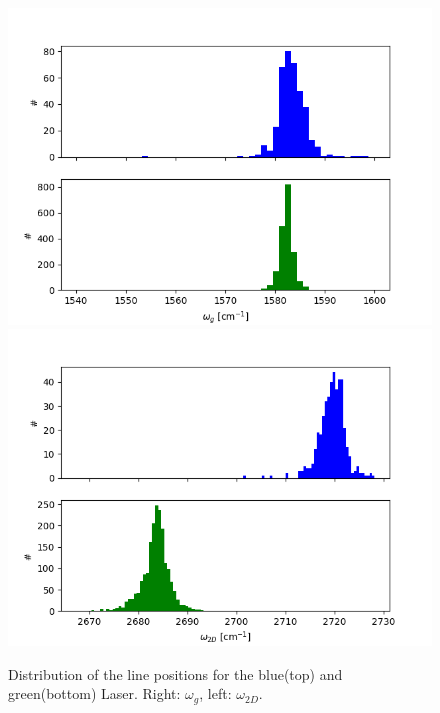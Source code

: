 \documentclass[12pt,a4paper]{article}
\begin{document}
\begin{figure}
\centering
\includegraphics[scale=0.5]{Bilder/Laser/omegag_hist.png}
\includegraphics[scale=0.5]{Bilder/Laser/omega2d_hist.png}
\caption{Distribution of the line positions for the blue(top) and green(bottom) Laser. Right: $\omega_{g}$, left: $\omega_{2D}$.}
\label{fig:Laser_omega_hist}
\end{figure}
\end{document}
